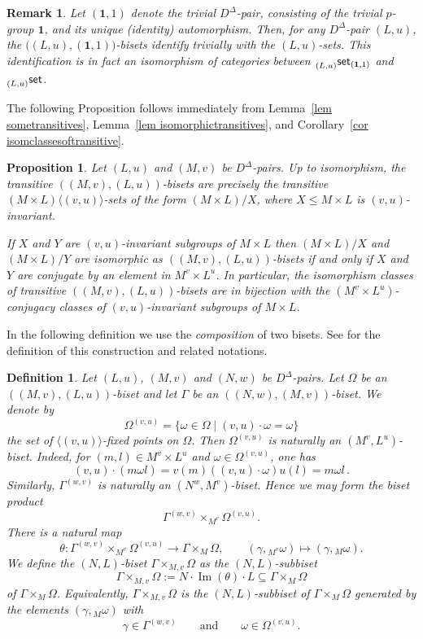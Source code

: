 \documentclass[11pt]{article}
\theoremstyle{change}  %
\newtheorem{proposition}[theorem]{Proposition}
\newtheorem{remark}[theorem]{Remark}
\newtheorem{definition}[theorem]{Definition}
\renewcommand{\le}{\leqslant} %
\newcommand{\catfont}{\mathsf}
\newcommand{\lset}[1]{\llap{\phantom{|}}_{#1}\catfont{set}}
\newcommand{\DD}{D^{\Delta}}
\newcommand{\pset}[1]{\lset{#1}}
\newcommand{\lbiset}[2]{\llap{\phantom{|}}_{#1}\catfont{set}_{#2}}
\def\un{\mathbf{1}}
\begin{document}
\begin{remark}\label{Un 1}
Let $(\un,1)$ denote the {\em trivial} $\DD$-pair, consisting of the trivial $p$-group $\un$, and its unique (identity) automorphism. Then, for any $\DD$-pair $(L,u)$, the $\big((L,u),(\un,1)\big)$-bisets identify trivially with the $(L,u)$-sets. This identification is in fact an isomorphism of categories between $\lbiset{(L,u)}{(\un,1)}$ and $\pset{(L,u)}$.
\end{remark}


The following
Proposition follows immediately from Lemma~\ref{lem sometransitives}, Lemma~\ref{lem isomorphictransitives},
and Corollary~\ref{cor isomclassesoftransitive}.

\begin{proposition}\label{prop transitivebisets}
Let $(L,u)$ and $(M,v)$ be $\DD$-pairs. Up to isomorphism, the transitive $((M,v),(L,u))$-bisets are precisely the transitive $(M\times L)\langle(v,u)\rangle$-sets of the form $(M\times L)/X$, where $X\le M\times L$ is $(v,u)$-invariant. 

If $X$ and $Y$ are $(v,u)$-invariant subgroups of $M\times L$ then $(M\times L)/X$ and $(M\times L)/Y$ are isomorphic as $((M,v),(L,u))$-bisets if and only if $X$ and $Y$ are conjugate by an element in $M^v\times L^u$. In particular, the isomorphism classes of transitive $((M,v),(L,u))$-bisets are in bijection with the $(M^v\times L^u)$-conjugacy classes of $(v,u)$-invariant subgroups of $M\times L$. 
\end{proposition}


 In the following definition we use the {\em composition} of two bisets. See \cite[Definition~2.3.11]{Bouc2010a} for the definition of this construction and related notations.

\begin{definition}\label{composition}
	Let $(L,u)$, $(M,v)$ and $(N,w)$ be $\DD$-pairs. Let $\Omega$ be an
	$((M,v),(L,u))$-biset and let $\Gamma$ be an $((N,w),(M,v))$-biset.	We denote by
	\[
	\Omega^{(v,u)}=\{\omega\in \Omega\mid (v,u)\cdot \omega=\omega\}
	\]
	the set of $\langle(v,u)\rangle$-fixed points on $\Omega$. Then $\Omega^{(v,u)}$ is naturally an $(M^v,L^u)$-biset. Indeed, for $(m,l)\in M^v\times L^u$ and $\omega\in \Omega^{(v,u)}$, one has
	\[
	(v,u)\cdot (m\omega l)=v(m)((v,u)\cdot \omega)u(l)=m\omega l\,.
	\]
	Similarly, $\Gamma^{(w,v)}$ is naturally an $(N^w,M^v)$-biset. Hence we may form the biset product
	\[
	\Gamma^{(w,v)}\times_{M^v} \Omega^{(v,u)}.
	\]
	There is a natural map
	\[
	\theta\colon
	\Gamma^{(w,v)}\times_{M^v} \Omega^{(v,u)}\longrightarrow \Gamma \times_M \Omega, \qquad (\gamma,{}_{M^v}\omega)\mapsto (\gamma,{}_M \omega).
	\]
	We define the $(N,L)$-biset $\Gamma\times_{M,v}\Omega$ as the %
	$(N,L)$-subbiset
	\[
	\Gamma\times_{M,v}\Omega:=N\cdot \operatorname{Im}(\theta)\cdot L \subseteq \Gamma\times_M \Omega
	\]
	of $\Gamma\times_M \Omega$. Equivalently, $\Gamma\times_{M,v}\Omega$ is the $(N,L)$-subbiset of $\Gamma\times_M \Omega$
	generated by the elements $(\gamma,{}_M \omega)$ with
	\[
	\gamma\in \Gamma^{(w,v)} \qquad\text{and}\qquad \omega\in \Omega^{(v,u)}.
	\]
\end{definition}
\end{document}
